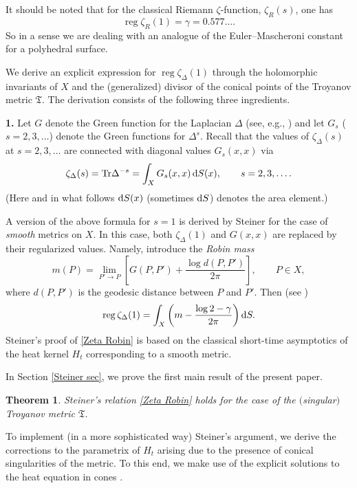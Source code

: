 \documentclass[pdftex]{sigma}
\numberwithin{equation}{section}
\newtheorem{Theorem}{Theorem}[section]
\theoremstyle{definition}
\begin{document}
It should be noted that for the classical Riemann $\zeta$-function, $\zeta_R(s)$, one has
\[\operatorname{reg}\zeta_R(1)=\gamma=0.577 \dots . \]
So in a sense we are dealing with an analogue of the Euler--Mascheroni constant for a polyhedral surface.

We derive an explicit expression for $\operatorname{reg}\zeta_\Delta(1)$ through the holomorphic invariants of $X$ and the (generalized) divisor of the conical points of the Troyanov metric $\mathfrak{T}$. The derivation consists of the following three ingredients.

{\bf 1.} Let $G$ denote the Green function for the Laplacian $\Delta$ (see, e.g., \cite[p.~25]{Fay}) and let $G_s$ ($s=2,3,\dots$) denote the Green functions for $\Delta^s$. Recall that the values of $\zeta_\Delta(s)$ at $s=2,3,\dots$ are connected with diagonal values $G_s(x,x)$ via
\[\zeta_\Delta(s)={\rm Tr}\Delta^{-s}=\int_{X}G_s(x,x)\,{\rm d }S(x), \qquad s=2,3,\dots.\]
(Here and in what follows ${\rm d }S(x)$ (sometimes ${\rm d }S$) denotes the area element.)

A version of the above formula for $s=1$ is derived by Steiner \cite{Steiner} for the case of {\it smooth} metrics on $X$. In this case, both $\zeta_\Delta(1)$ and $G(x,x)$ are replaced by their regularized values. Namely, introduce the {\it Robin mass}
\begin{equation}
\label{Robin mass}
m(P)=\lim_{P'\to P}\left[G(P,P')+\frac{\log d(P,P')}{2\pi}\right], \qquad P\in X,
\end{equation}
where $d(P,P')$ is the geodesic distance between $P$ and $P'$. Then (see \cite[Proposition 2]{Steiner})
\begin{equation}
\label{Zeta Robin}
\operatorname{reg}\zeta_\Delta(1)=\int_{X}\left(m-\frac{\log 2-\gamma}{2\pi}\right){\rm d }S .
\end{equation}
 Steiner's proof of \eqref{Zeta Robin} is based on the classical short-time asymptotics of the heat kernel $H_t$ corresponding to a smooth metric.

In Section \ref{Steiner sec}, we prove the first main result of the present paper.
\begin{Theorem}
Steiner's relation \eqref{Zeta Robin} holds for the case of the $($singular$)$ Troyanov metric $\mathfrak{T}$.
\end{Theorem}

 To implement (in a more sophisticated way) Steiner's argument, we derive the corrections to the parametrix of $H_t$ arising due to the presence of conical singularities of the metric. To this end, we make use of the explicit solutions to the heat equation in cones \cite{Carslaw,Dowker}.
\end{document}
